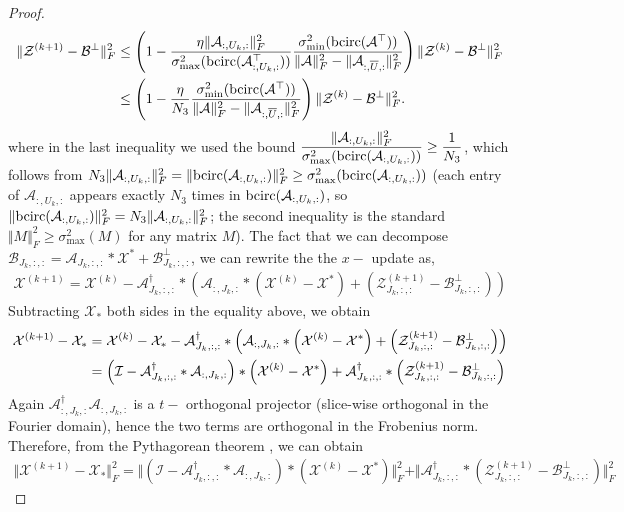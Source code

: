 \documentclass[11pt]{article}
\def\fm#1{\mathcal{#1}}
\def\b{\beta}
\def \a#1{\fm A_{:, #1, :}}
\def \b#1{\fm B_{#1, :, :}}
\def \ai#1{\fm A_{#1, :, :}}
\def \z#1#2{\fm Z^{(#1)}_{#2, :, :}}
\def \bp#1{\fm B^{\perp}_{#1, :, :}}
\def \x#1{\fm X^{(#1)}}
\begin{document}
\begin{proof}
\begin{align}
     \Vert   \fm Z^{(k+1)} - \fm B^\perp  \Vert_F^2  & \leq  \left( 1 - \frac{\eta \Vert \a{U_k} \Vert_F^2}{ \sigma_{\max}^2(\bcirc(\a{U_k}^\top)) } \frac{\sigma_{\min}^2(\bcirc(\fm A^\top))}{\Vert \fm A \Vert_F^2 - \Vert \a{\overline{U}} \Vert_F^2}   \right) \Vert  \fm Z^{(k)} - \fm B^\perp \Vert_F^2  \notag \\
     & \leq \left( 1 - \frac{\eta}{N_3}  \frac{\sigma_{\min}^2(\bcirc(\fm A^\top))}{\Vert \fm A \Vert_F^2 - \Vert \a{\overline{U}} \Vert_F^2}   \right) \Vert  \fm Z^{(k)} - \fm B^\perp \Vert_F^2 .
\end{align}
where in the last inequality we used the bound
$\dfrac{\Vert \a{U_k}\Vert_F^2}{\sigma_{\max}^2(\bcirc(\a{U_k}))} \geq \dfrac{1}{N_3}$,
which follows from $N_3\Vert \a{U_k}\Vert_F^2 = \Vert\bcirc(\a{U_k})\Vert_F^2 \geq \sigma_{\max}^2(\bcirc(\a{U_k}))$
(each entry of $\a{U_k}$ appears exactly $N_3$ times in $\bcirc(\a{U_k})$, so
$\Vert\bcirc(\a{U_k})\Vert_F^2 = N_3\Vert \a{U_k}\Vert_F^2$; the second inequality is
the standard $\Vert M\Vert_F^2\geq\sigma_{\max}^2(M)$ for any matrix $M$). The fact that  we can decompose $\b{J_k} = \ai{J_k}*\fm X^\ast + \bp{J_k} $, we can rewrite the the $x-$ update as,
\begin{align*}
   \fm X^{(k+1)} = \x k - \ai{J_k}^\dagger * \left( \a{J_k} *\left(\x k - \fm X^\ast \right) + \left(\z{k+1}{J_k} - \bp{J_k}  \right)\right)
\end{align*}
Subtracting $\fm X_\ast$  both sides  in the equality above, we obtain
\begin{align}
   \x {k+1} - \fm X_\ast  & =  \x{k} - \fm X_\ast  - \ai{J_k}^\dagger * \left( \a{J_k} *\left(\x k - \fm X^\ast \right) + \left(\z{k+1}{J_k} - \bp{J_k}  \right)\right) \notag\\
   & =  \left( \fm I - \ai{J_k}^\dagger *  \a{J_k} \right) *\left(\x k - \fm X^\ast   \right) +  \ai{J_k}^\dagger* \left(\z{k+1}{J_k} - \bp{J_k}  \right)
\end{align}
Again $\a{J_k}^\dagger \a{J_k}$ is a $t-$ orthogonal projector  (slice-wise  orthogonal in the Fourier  domain), hence the two terms are orthogonal in the Frobenius norm. Therefore,  from the  Pythagorean theorem , we can obtain
\begin{align}
    \Vert \x{k+1} - \fm X_\ast \Vert_F^2 = \Vert \left( \fm I - \ai{J_k}^\dagger *  \a{J_k} \right) *\left(\x k - \fm X^\ast   \right) \Vert_F^2  +  \Vert  \ai{J_k}^\dagger* \left(\z{k+1}{J_k} - \bp{J_k}  \right) \Vert_F^2  \label{eq:eq-5}
\end{align}

\end{proof}
\end{document}
